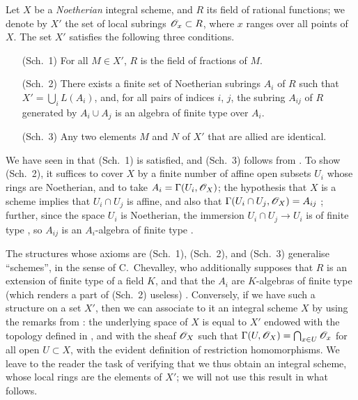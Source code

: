 \begin{env}[8.3.1]
\label{I.8.3.1}
Let $X$ be a \emph{Noetherian} integral scheme, and $R$ its field of rational functions;
we denote by $X'$ the set of local subrings $\mathscr{O}_x\subset R$, where $x$ ranges over all points of $X$.
The set $X'$ satisfies the following three conditions.
\begin{enumerate}
  \item[(Sch.~1)] For all $M\in X'$, $R$ is the field of fractions of $M$.
  \item[(Sch.~2)] There exists a finite set of Noetherian subrings $A_i$ of $R$ such that $X'=\bigcup_i L(A_i)$, and, for all pairs of indices $i$, $j$, the subring $A_{ij}$ of $R$ generated by $A_i\cup A_j$ is an algebra of finite type over $A_i$.
  \item[(Sch.~3)] Any two elements $M$ and $N$ of $X'$ that are allied are identical.
\end{enumerate}
\end{env}

We have seen in  that (Sch.~1) is satisfied, and (Sch.~3) follows from .
To show (Sch.~2), it suffices to cover $X$ by a finite number of affine open subsets $U_i$ whose rings are Noetherian, and to take $A_i=\Gamma(U_i,\mathscr{O}_X)$;
the hypothesis that $X$ is a scheme implies that $U_i\cap U_j$ is affine, and also that $\Gamma(U_i\cap U_j,\mathscr{O}_X)=A_{ij}$ ;
further, since the space $U_i$ is Noetherian, the immersion $U_i\cap U_j\to U_i$ is of finite type , so $A_{ij}$ is an $A_i$-algebra of finite type .

\begin{env}[8.3.2]
\label{I.8.3.2}
The structures whose axioms are (Sch.~1), (Sch.~2), and (Sch.~3) generalise ``schemes'', in the sense of C.~Chevalley, who additionally supposes that $R$ is an extension of finite type of a field $K$, and that the $A_i$ are $K$-algebras of finite type (which renders a part of (Sch.~2) useless) \cite{I-1}.
Conversely, if we have such a structure on a set $X'$, then we can associate to it an integral scheme $X$ by using the remarks from : the underlying space of $X$ is equal to $X'$ endowed with the topology defined in , and with the sheaf $\mathscr{O}_X$ such that $\Gamma(U,\mathscr{O}_X)=\bigcap_{x\in U}\mathscr{O}_x$ for all open $U\subset X$, with the evident definition of restriction homomorphisms.
We leave to the reader the task of verifying that we thus obtain an integral scheme, whose local rings are the elements of $X'$;
we will not use this result in what follows.
\end{env}

